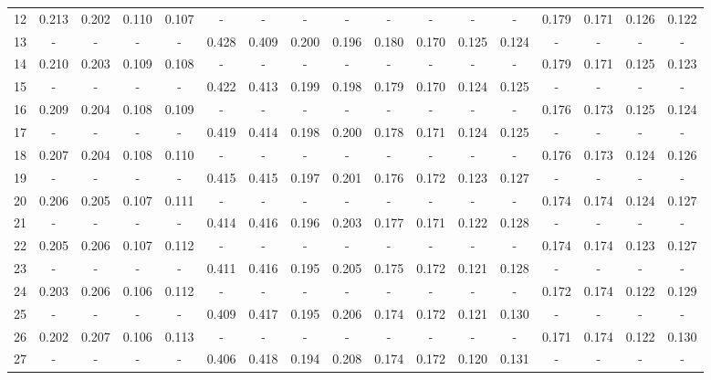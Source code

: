 \documentclass{report}
\begin{document}
\begin{appendices}
\begin{sidewaystable}
\begin{tabular}{|c|cccc|cccc|cccc|cccc|}
12 & 0.213 & 0.202 & 0.110 & 0.107 &   -   &   -   &   -   &   -   &   -   &   -   &   -   &   -   & 0.179 & 0.171 & 0.126 & 0.122\\
13 &   -   &   -   &   -   &   -   & 0.428 & 0.409 & 0.200 & 0.196 & 0.180 & 0.170 & 0.125 & 0.124 &   -   &   -   &   -   &   -  \\
14 & 0.210 & 0.203 & 0.109 & 0.108 &   -   &   -   &   -   &   -   &   -   &   -   &   -   &   -   & 0.179 & 0.171 & 0.125 & 0.123\\
15 &   -   &   -   &   -   &   -   & 0.422 & 0.413 & 0.199 & 0.198 & 0.179 & 0.170 & 0.124 & 0.125 &   -   &   -   &   -   &   -  \\
16 & 0.209 & 0.204 & 0.108 & 0.109 &   -   &   -   &   -   &   -   &   -   &   -   &   -   &   -   & 0.176 & 0.173 & 0.125 & 0.124\\
17 &   -   &   -   &   -   &   -   & 0.419 & 0.414 & 0.198 & 0.200 & 0.178 & 0.171 & 0.124 & 0.125 &   -   &   -   &   -   &   -  \\
18 & 0.207 & 0.204 & 0.108 & 0.110 &   -   &   -   &   -   &   -   &   -   &   -   &   -   &   -   & 0.176 & 0.173 & 0.124 & 0.126\\
19 &   -   &   -   &   -   &   -   & 0.415 & 0.415 & 0.197 & 0.201 & 0.176 & 0.172 & 0.123 & 0.127 &   -   &   -   &   -   &   -  \\
20 & 0.206 & 0.205 & 0.107 & 0.111 &   -   &   -   &   -   &   -   &   -   &   -   &   -   &   -   & 0.174 & 0.174 & 0.124 & 0.127\\
21 &   -   &   -   &   -   &   -   & 0.414 & 0.416 & 0.196 & 0.203 & 0.177 & 0.171 & 0.122 & 0.128 &   -   &   -   &   -   &   -  \\
22 & 0.205 & 0.206 & 0.107 & 0.112 &   -   &   -   &   -   &   -   &   -   &   -   &   -   &   -   & 0.174 & 0.174 & 0.123 & 0.127\\
23 &   -   &   -   &   -   &   -   & 0.411 & 0.416 & 0.195 & 0.205 & 0.175 & 0.172 & 0.121 & 0.128 &   -   &   -   &   -   &   -  \\
24 & 0.203 & 0.206 & 0.106 & 0.112 &   -   &   -   &   -   &   -   &   -   &   -   &   -   &   -   & 0.172 & 0.174 & 0.122 & 0.129\\
25 &   -   &   -   &   -   &   -   & 0.409 & 0.417 & 0.195 & 0.206 & 0.174 & 0.172 & 0.121 & 0.130 &   -   &   -   &   -   &   -  \\
26 & 0.202 & 0.207 & 0.106 & 0.113 &   -   &   -   &   -   &   -   &   -   &   -   &   -   &   -   & 0.171 & 0.174 & 0.122 & 0.130\\
27 &   -   &   -   &   -   &   -   & 0.406 & 0.418 & 0.194 & 0.208 & 0.174 & 0.172 & 0.120 & 0.131 &   -   &   -   &   -   &   -  \\

\end{tabular}
\end{sidewaystable}
\end{appendices}
\end{document}
